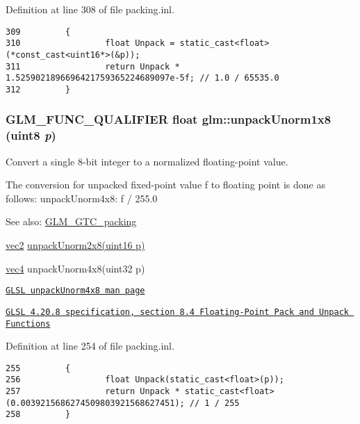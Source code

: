 Definition at line 308 of file packing.inl.

\begin{Code}\begin{verbatim}309         {
310                 float Unpack = static_cast<float>(*const_cast<uint16*>(&p));
311                 return Unpack * 1.5259021896696421759365224689097e-5f; // 1.0 / 65535.0
312         }
\end{verbatim}
\end{Code}


\hypertarget{group__gtc__packing_g32f3f2642df2ea87449d59fb614a8305}{
\subsubsection[unpackUnorm1x8]{\setlength{\rightskip}{0pt plus 5cm}GLM\_\-FUNC\_\-QUALIFIER float glm::unpackUnorm1x8 (uint8 {\em p})}}
\label{group__gtc__packing_g32f3f2642df2ea87449d59fb614a8305}


Convert a single 8-bit integer to a normalized floating-point value.

The conversion for unpacked fixed-point value f to floating point is done as follows: unpackUnorm4x8: f / 255.0

\begin{Desc}
\item[See also:]\hyperlink{group__gtc__packing}{GLM\_\-GTC\_\-packing} 

\hyperlink{group__core__types_ga1618f51db67eaa145db101d8c8431d8}{vec2} \hyperlink{group__gtc__packing_g96ce0c24339ee676e28a027fffd1edf6}{unpackUnorm2x8(uint16 p)} 

\hyperlink{group__core__types_g5881b1b022d7fd1b7218f5916532dd02}{vec4} unpackUnorm4x8(uint32 p) 

\href{http://www.opengl.org/sdk/docs/manglsl/xhtml/unpackUnorm4x8.xml}{\tt GLSL unpackUnorm4x8 man page} 

\href{http://www.opengl.org/registry/doc/GLSLangSpec.4.20.8.pdf}{\tt GLSL 4.20.8 specification, section 8.4 Floating-Point Pack and Unpack Functions} \end{Desc}


Definition at line 254 of file packing.inl.

\begin{Code}\begin{verbatim}255         {
256                 float Unpack(static_cast<float>(p));
257                 return Unpack * static_cast<float>(0.0039215686274509803921568627451); // 1 / 255
258         }
\end{verbatim}
\end{Code}


